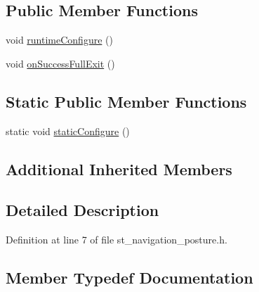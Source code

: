 \subsection*{Public Member Functions}
\begin{DoxyCompactItemize}
\item 
void \hyperlink{structsm__moveit__4_1_1place__states_1_1StNavigationPosture_aaf8ca02fa5a8185baf6bfc55731b1926}{runtime\+Configure} ()
\item 
void \hyperlink{structsm__moveit__4_1_1place__states_1_1StNavigationPosture_a95ab74dae51538aeae46f71b515bc61e}{on\+Success\+Full\+Exit} ()
\end{DoxyCompactItemize}
\subsection*{Static Public Member Functions}
\begin{DoxyCompactItemize}
\item 
static void \hyperlink{structsm__moveit__4_1_1place__states_1_1StNavigationPosture_a29ac0c6cd858bb59ca3bc103da13b0a0}{static\+Configure} ()
\end{DoxyCompactItemize}
\subsection*{Additional Inherited Members}


\subsection{Detailed Description}


Definition at line 7 of file st\+\_\+navigation\+\_\+posture.\+h.



\subsection{Member Typedef Documentation}
\mbox{\label{structsm__moveit__4_1_1place__states_1_1StNavigationPosture_a2588352d77d56f7a1f3df49fe37629d4}} 
